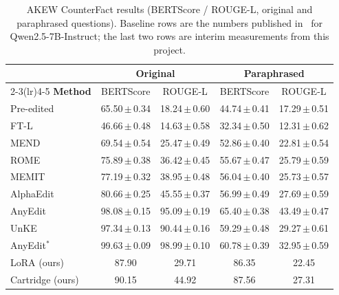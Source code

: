 \documentclass[10pt,a4paper]{article}
\begin{document}
\begin{table}[ht]
\centering
\footnotesize
\begin{tabular}{lcccc}
\toprule
& \multicolumn{2}{c}{\textbf{Original}} & \multicolumn{2}{c}{\textbf{Paraphrased}}\\
\cmidrule(lr){2-3}\cmidrule(lr){4-5}
\textbf{Method} & BERTScore & ROUGE-L & BERTScore & ROUGE-L\\
\midrule
Pre-edited                        & 65.50\,$\pm$\,0.34 & 18.24\,$\pm$\,0.60 & 44.74\,$\pm$\,0.41 & 17.29\,$\pm$\,0.51\\
FT-L                              & 46.66\,$\pm$\,0.48 & 14.63\,$\pm$\,0.58 & 32.34\,$\pm$\,0.50 & 12.31\,$\pm$\,0.62\\
MEND                              & 69.54\,$\pm$\,0.54 & 25.47\,$\pm$\,0.49 & 52.86\,$\pm$\,0.40 & 22.81\,$\pm$\,0.54\\
ROME~\citep{meng2023locatingeditingfactualassociations}         & 75.89\,$\pm$\,0.38 & 36.42\,$\pm$\,0.45 & 55.67\,$\pm$\,0.47 & 25.79\,$\pm$\,0.59\\
MEMIT~\citep{meng2023masseditingmemorytransformer}       & 77.19\,$\pm$\,0.32 & 38.95\,$\pm$\,0.48 & 56.04\,$\pm$\,0.40 & 25.73\,$\pm$\,0.57\\
AlphaEdit                         & 80.66\,$\pm$\,0.25 & 45.55\,$\pm$\,0.37 & 56.99\,$\pm$\,0.49 & 27.69\,$\pm$\,0.59\\
AnyEdit~\citep{jiang2025anyediteditknowledgeencoded}  & 98.08\,$\pm$\,0.15 & 95.09\,$\pm$\,0.19 & 65.40\,$\pm$\,0.38 & 43.49\,$\pm$\,0.47\\
UnKE                              & 97.34\,$\pm$\,0.13 & 90.44\,$\pm$\,0.16 & 59.29\,$\pm$\,0.48 & 29.27\,$\pm$\,0.61\\
AnyEdit$^{*}$                     & 99.63\,$\pm$\,0.09 & 98.99\,$\pm$\,0.10 & 60.78\,$\pm$\,0.39 & 32.95\,$\pm$\,0.59\\
\midrule
LoRA (ours)                       & 87.90 & 29.71 & 86.35 & 22.45\\
Cartridge (ours)                  & 90.15 & 44.92 & 87.56 & 27.31\\
\bottomrule
\end{tabular}
\caption{AKEW CounterFact results (BERTScore / ROUGE-L, original and paraphrased
questions). Baseline rows are the numbers published in~\citep{jiang2025anyediteditknowledgeencoded} for
Qwen2.5-7B-Instruct; the last two rows are interim measurements from this project.}
\label{tab:results}
\end{table}
\end{document}
